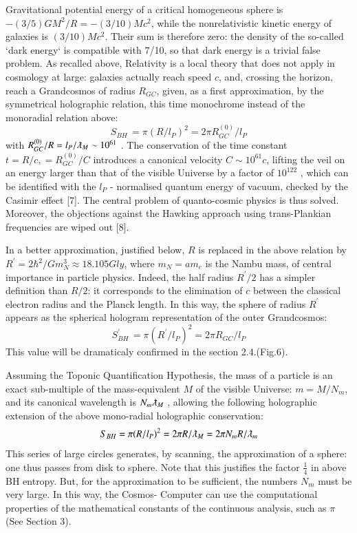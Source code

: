 \documentclass[twoside,draft]{article}
\begin{document}
\begin{sloppypar}
{Gravitational potential energy of a critical homogeneous sphere is $-(3/5)GM^{2}/R = -
(3/10)Mc^{2}$, while the nonrelativistic kinetic energy of galaxies is $(3/10)Mc^{2}$. Their sum is therefore
zero: the density of the so-called `dark energy` is compatible with 7/10, so that dark energy is a
trivial false problem. As recalled above, Relativity is a local theory that does not apply in
cosmology at large: galaxies actually reach speed $c$, and, crossing the horizon, reach a Grandcosmos of
radius $R_{GC}$, given, as a first approximation, by the symmetrical holographic relation, this time
monochrome instead of the monoradial relation above:
\begin{equation}
S_{BH}\, = \pi(R/l_P )^{2} = 2\pi R^{(0)}_{GC} /l_{P}
\end{equation}
with $R^{(0)}_{GC} /R = l_{P} /\lambdabar_{M} \sim 10^{61}$ . The conservation of the time constant $t = R/c, = R^{(0)}_{GC} /C$ introduces a canonical velocity $C \sim 10^{61} c$, lifting the veil on an energy larger than that of the visible Universe by a factor of $10^{122}$ , which can be identified with the $l_{P}$ - normalised quantum energy of vacuum, checked by
the Casimir effect [7]. The central problem of quanto-cosmic physics is thus solved. Moreover, the
objections against the Hawking approach using trans-Plankian frequencies are wiped out [8].

In a better approximation, justified below, $R$ is replaced in the above relation by $R^{\prime} = 2\hbar^{2}/Gm_{N}^{3}
\approx 18.105 Gly$, where $m_{N} = am_{e}$ is the Nambu mass, of central importance in particle
physics. Indeed, the half radius $R^{\prime}/2$ has a simpler definition than $R/2$: it corresponds to the
elimination of $c$ between the classical electron radius and the Planck length. In this way, the sphere
of radius $R^{\prime}$ appears as the spherical hologram representation of the outer Grandcosmos:
\begin{equation}
S^{\prime}_{BH}\, = \pi(R^{\prime}/l_{P})^{2} = 2\pi R_{GC} /l_{P}
\end{equation}
This value will be dramaticaly confirmed in the section 2.4.(Fig.6).

Assuming the Toponic Quantification Hypothesis, the mass of a particle is an exact sub-multiple
of the mass-equivalent $M$ of the visible Universe: $m = M/N_{m}$, and its canonical wavelength is $N_m \lambdabar_{M}$ ,
allowing the following holographic extension of the above mono-radial holographic conservation:
\begin{equation}
S_{BH} = \pi(R/l_{P})^{2} = 2\pi R/\lambdabar_{M} = 2\pi N_{m} R/\lambdabar_{m}
\end{equation}
This series of large circles generates, by scanning, the approximation of a sphere: one thus passes
from disk to sphere. Note that this justifies the factor $\frac{1}{4}$ in above BH entropy. But, for
the approximation to be sufficient, the numbers $N_{m}$ must be very large. In this way, the Cosmos-
Computer can use the computational properties of the mathematical constants of the continuous
analysis, such as $\pi$ (See Section 3).

}
\end{sloppypar}
\end{document}
